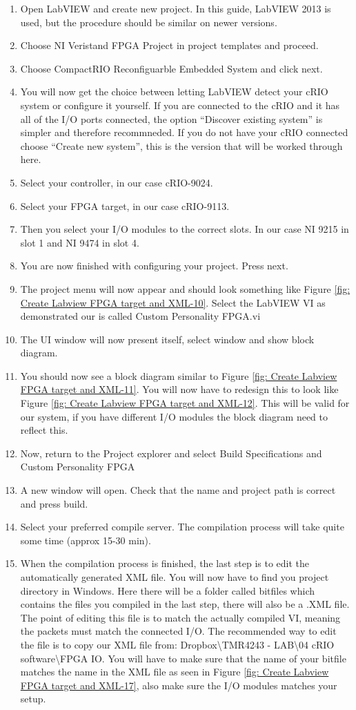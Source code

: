 \begin{enumerate}
	\item Open LabVIEW and create new project. In this guide, LabVIEW 2013 is used, but the procedure should be similar on newer versions. 
	\item Choose NI Veristand FPGA Project in project templates and proceed.
	\item Choose CompactRIO Reconfiguarble Embedded System and click next.
	\item You will now get the choice between letting LabVIEW detect your cRIO  system or configure it yourself. If you are connected to the cRIO and it has all of the I/O ports connected, the option ``Discover existing system'' is simpler and therefore recommneded. If you do not have your cRIO connected choose ``Create new system'', this is the version that will be worked through here.
	\item Select your controller, in our case cRIO-9024.
	\item Select your FPGA target, in our case cRIO-9113.
	\item Then you select your I/O modules to the correct slots. In our case NI 9215 in slot 1 and NI 9474 in slot 4.
	\item You are now finished with configuring your project. Press next.
	\item The project menu will now appear and should look something like Figure
	\ref{fig: Create Labview FPGA target and XML-10}. Select the LabVIEW VI as demonstrated our is called Custom Personality FPGA.vi
	\item The UI window will now present itself, select window and show block diagram.
	\item You should now see a block diagram similar to Figure \ref{fig: Create Labview FPGA target and XML-11}. You will now have to redesign this to look like Figure \ref{fig: Create Labview FPGA target and XML-12}. This will be valid for our system, if you have different I/O modules the block diagram need to reflect this.
	\item Now, return to the Project explorer and select Build Specifications and Custom Personality FPGA
	\item A new window will open. Check that the name and project path is correct and press build.
	\item Select your preferred compile server. The compilation process will take quite some time (approx 15-30 min).
	\item When the compilation process is finished, the last step is to edit the automatically generated XML file. You will now have to find you project directory in Windows. Here there will be a folder called bitfiles which contains the files you compiled in the last step, there will also be a .XML file. The point of editing this file is to match the actually compiled VI, meaning the packets must match the connected I/O. The recommended way to edit the file is to copy our XML file from: Dropbox\textbackslash{}TMR4243 - LAB\textbackslash{}04 cRIO software\textbackslash{}FPGA IO. You will have to make sure that the name of your bitfile matches the name in the XML file as seen in Figure \ref{fig: Create Labview FPGA target and XML-17}, also make sure the I/O modules matches your setup.

\end{enumerate}
